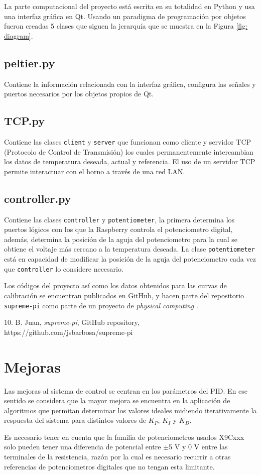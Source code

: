 \documentclass{wileysix}
\begin{document}
La parte computacional del proyecto est\'a escrita en su totalidad en Python y usa una interfaz gr\'afica en Qt. Usando un paradigma de programaci\'on por objetos fueron creadas 5 clases que siguen la jerarqu\'ia que se muestra en la Figura \ref{fig: diagram}. 

\section{peltier.py}
Contiene la informaci\'on relacionada con la interfaz gr\'afica, configura las se\~nales y puertos necesarios por los objetos propios de Qt.


\section{TCP.py}
Contiene las clases \verb|client| y \verb|server| que funcionan como cliente y servidor TCP (Protocolo de Control de Transmisi\'on) los cuales permanentemente intercambian los datos de temperatura deseada, actual y referencia. El uso de un servidor TCP permite interactuar con el horno a trav\'es de una red LAN.


\section{controller.py}
Contiene las clases \verb|controller| y \verb|potentiometer|, la primera determina los puertos l\'ogicos con los que la Raspberry controla el potenciometro digital, adem\'as, determina la posici\'on de la aguja del potenciometro para la cual se obtiene el voltaje m\'as cercano a la temperatura deseada. La clase \verb|potentiometer| est\'a en capacidad de modificar la posici\'on de la aguja del potenciometro cada vez que \verb|controller| lo considere necesario.


\newpage
Los c\'odigos del proyecto as\'i como los datos obtenidos para las curvas de calibraci\'on se encuentran publicados en GitHub, y hacen parte del repositorio \verb|supreme-pi| como parte de un proyecto de \textit{physical computing} \cite{GitHub}.
\begin{chapreferences}{10.}
	B. Juan, \textit{supreme-pi}, GitHub repository,
	https://github.com/jsbarbosa/supreme-pi
\end{chapreferences}

\chapter{Mejoras}
Las mejoras al sistema de control se centran en los par\'ametros del PID. En ese sentido se considera que la mayor mejora se encuentra en la aplicaci\'on de algoritmos que permitan determinar los valores ideales midiendo iterativamente la respuesta del sistema para distintos valores de $K_P$, $K_I$ y $K_D$.

Es necesario tener en cuenta que la familia de potenciometros usados X9Cxxx solo pueden tener una diferencia de potencial entre $\pm$5 V y 0 V entre las terminales de la resistencia, raz\'on por la cual es necesario recurrir a otras referencias de potenciometros digitales que no tengan esta limitante.
\end{document}
